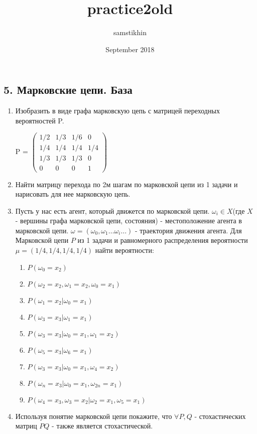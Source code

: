 \documentclass[a4paper, 14pt]{extarticle}
\title{practice2old}
\author{samstikhin}
\date{September 2018}
\begin{document}
\subsection*{5. Марковские цепи. База}
\begin{enumerate}
    \item Изобразить в виде графа марковскую цепь с матрицей переходных вероятностей P.

\begin{center}
    P = $\left ( \begin{array}{cccc}
        1/2 & 1/3 & 1/6 & 0 \\
        1/4 & 1/4 & 1/4 & 1/4\\
        1/3 & 1/3 & 1/3 & 0\\
        0 & 0 & 0 & 1
    \end{array} \right )$
\end{center}

\item Найти матрицу перехода по 2м шагам по марковской цепи из 1 задачи и нарисовать для нее марковскую цепь.
\item Пусть у нас есть агент, который движется по марковской цепи. $\omega_i \in X$(где $X$ - вершины графа марковской цепи, состояния) - местоположение агента в марковской цепи. $\omega = (\omega_0, \omega_1 \ldots \omega_i \ldots)$ - траектория движения агента. \newline
Для Марковской цепи $P$ из 1 задачи и равномерного распределения вероятности $\mu = (1/4, 1/4, 1/4, 1/4)$ найти вероятности:
\begin{enumerate}
    \item $P(\omega_0 = x_2)$
    \item $P(\omega_2 = x_2,\omega_1 = x_2,\omega_0 = x_1)$
    \item $P(\omega_1 = x_2|\omega_0 = x_1)$
    \item $P(\omega_3 = x_3|\omega_1 = x_1)$
    \item $P(\omega_3 = x_3|\omega_0 = x_1,\omega_1 = x_2)$
    \item $P(\omega_5 = x_3|\omega_6 = x_1)$
    \item $P(\omega_3 = x_3|\omega_0 = x_1,\omega_4 = x_2)$
    \item $P(\omega_n = x_3|\omega_0 = x_1, \omega_{2n} = x_1)$
    \item $P(\omega_4 = x_3, \omega_3 = x_2|\omega_2 = x_1, \omega_5 = x_1)$
\end{enumerate}
 \item Используя понятие марковской цепи покажите, что $\forall P, Q$ - стохастических матриц $PQ$ - также является стохастической.

\end{enumerate}
\end{document}
